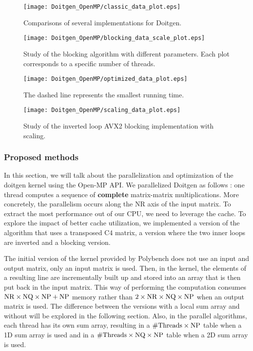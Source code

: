 \begin{figure}
  \texttt{[image: Doitgen\_OpenMP/classic\_data\_plot.eps]}
  \caption{Comparisons of several implementations for Doitgen.}
  \label{fig:doitgen_openmp_classic_data}
\end{figure}

\begin{figure}
  \texttt{[image: Doitgen\_OpenMP/blocking\_data\_scale\_plot.eps]}
  \caption{Study of the blocking algorithm with different parameters. Each plot corresponds to a specific number of threads.}
  \label{fig:doitgen_openmp_blocking_scale_data}
\end{figure}

\begin{figure}
  \texttt{[image: Doitgen\_OpenMP/optimized\_data\_plot.eps]}
  \caption{The dashed line represents the smallest running time.}
  \label{fig:doitgen_openmp_optimized_data}
\end{figure}

\begin{figure}
  \texttt{[image: Doitgen\_OpenMP/scaling\_data\_plot.eps]}
  \caption{Study of the inverted loop AVX2 blocking implementation with scaling.}
  \label{fig:doitgen_openmp_scaled_data}
\end{figure}

\subsubsection{Proposed methods}\label{proposed_methods_openmp}

In this section, we will talk about the parallelization and optimization of the doitgen kernel using the Open\hyp{}MP API. We parallelized Doitgen as follows : one thread computes a sequence of \textbf{complete} matrix-matrix multiplications. More concretely, the parallelism occurs along the NR axis of the input matrix. To extract the most performance out of our CPU, we need to leverage the cache. To explore the impact of better cache utilization, we implemented a version of the algorithm that uses a transposed C4 matrix, a version where the two inner loops are inverted and a blocking version.

 The initial version of the kernel provided by Polybench does not use an input and output matrix, only an input matrix is used. Then, in the kernel, the elements of a resulting line are incrementally built up and stored into an array that is then put back in the input matrix.
This way of performing the computation consumes ${\rm NR}\times{\rm NQ}\times{\rm NP} + {\rm NP}$ memory rather than $2\times{\rm NR}\times{\rm NQ}\times{\rm NP}$ when an output matrix is used. The difference between the versions with a local sum array and without will be explored in the following section.
Also, in the parallel algorithms, each thread has its own sum array, resulting in a ${\rm\#Threads}\times{\rm NP}$ table when a 1D sum array is used and in a ${\rm\#Threads}\times{\rm NQ}\times{\rm NP}$ table when a 2D sum array is used.

